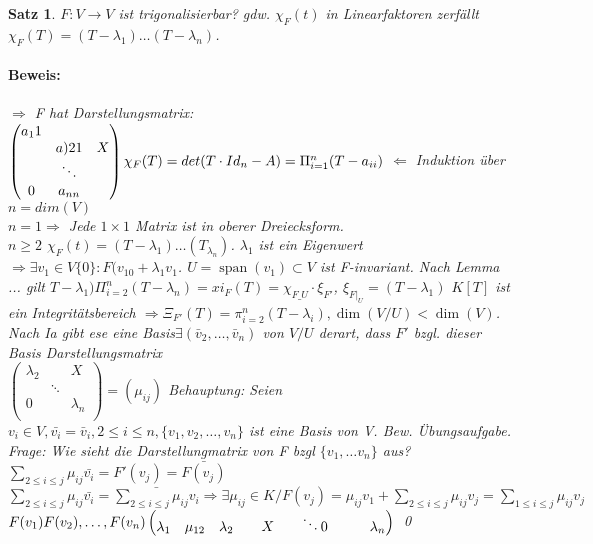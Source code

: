 \documentclass{report}
\newcommand{\lb}{\lambda}
\DeclareMathOperator{\Span}{span}
\theoremstyle{customrem}
\theoremstyle{customdef}
\newtheorem{satz}[definition]{Satz}
\renewenvironment{proof}{\paragraph{Beweis: }}{\qed}
\theoremstyle{customenv}
\begin{document}
\begin{satz}
  \(F : V \to V\) ist trigonalisierbar? gdw. \(\chi_F(t)\) in
  Linearfaktoren zerf\"allt \(\chi_F(T) = (T - \lb_1) \dots (T - \lb_n)\).
  
  \begin{proof}
    \(\Rightarrow\)
    F hat Darstellungsmatrix:\\
    \(
    \begin{pmatrix}
      a_11\\
           & a){21} & X\\
                    & \ddots\\
         0                     & a_{nn}\\
         
    \end{pmatrix}\\
    \chi_F(T) = det(T \cdot Id_n - A) = \Pi_{i=1}^n (T - a_{ii})
    \)
    \(\Leftarrow\)
    Induktion \"uber \(n = dim(V)\)\\
    \(n=1 \Rightarrow \) Jede \(1 \times 1\) Matrix ist in oberer Dreiecksform.\\
    \(n \ge 2\)  \(\chi_F(t) = (T - \lb_1) \dots (T_{\lb_n})\). \(\lb_1\) ist ein
    Eigenwert \( \Rightarrow \exists v_1 \in V\{0\} : F(v_10 + \lb_1 v_1\).
    \(U = \Span(v_1) \subset V\)  ist F-invariant. Nach Lemma ... gilt
    \(T - \lb_1) \Pi_{i=2}^n(T - \lb_n) = xi_F(T) = \chi_{F\_U} \cdot \xi_{F'}\), \(\xi_{F|_U} = (T - \lb_1)\)
    \(K[T]\) ist ein Integrit\"atsbereich \(\Rightarrow
    \Xi_{F'}(T) = \pi_{i=2}^n (T-\lb_i), \dim(V/U) < \dim(V)\).\\
    Nach Ia gibt ese eine Basis\(\exists (\bar{v}_2, \dots, \bar{v}_n)\) von
    \(V/U\) derart, dass \(F'\) bzgl. dieser Basis Darstellungsmatrix\\
    \(
    \begin{pmatrix}
      \lb_2 &        & X\\
            & \ddots &\\
      0     &        & \lb_n\\
    \end{pmatrix} = (\mu_{ij})
    \)
    Behauptung: Seien \(v_i \in V, \bar{v_i} = \bar{v}_i, 2 \le i \le n, \{v_1, v_2, \dots, v_n\}\) ist eine
    Basis von V. Bew. \"Ubungsaufgabe.\\
    Frage: Wie sieht die Darstellungmatrix von F bzgl \(\{v_1, \dots v_n\}\)
    aus?\\
    \(\sum_{2\le i \le j} \mu_{ij} \bar{v_i} = F'(v_j) = \bar{F(v_j)}\)\\
    \(\sum_{2\le i \le j} \mu_{ij} \bar{v_i} = \bar{\sum_{2\le i \le j} \mu_{ij} v_i}
    \Rightarrow \exists  \mu_{ij} \in K / F(v_j) = \mu_{ij}v_1 + \sum_{2 \le i \le j} \mu_{ij}v_j = \sum_{1 \le i \le j} \mu_{ij}v_j\)\\
    \(F(v_1) F(v_2), \dots, F(v_n)\\
    \begin{pmatrix}
    \lb_1 & \mu_{12}
          & \lb_2 &       & X
          &       & \ddots
    0     &       &       & \lb_n
    \end{pmatrix}
    \)
  \end{proof}
\end{satz}
\end{document}
